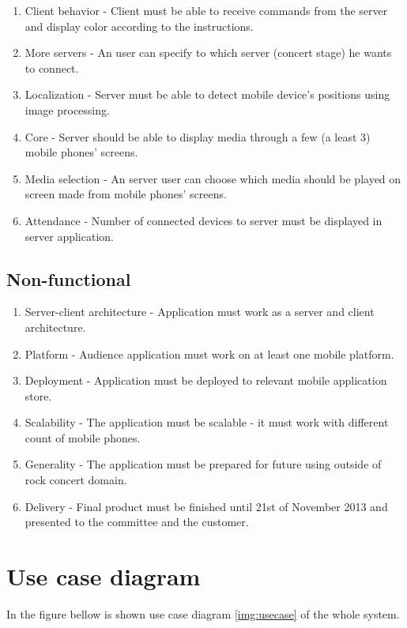     \begin{enumerate}
        \item Client behavior - Client must be able to receive commands from the server and display color according to the instructions.
        \item More servers - An user can specify to which server (concert stage) he wants to connect.
        \item Localization - Server must be able to detect mobile device's positions using image processing.
        \item Core - Server should be able to display media through a few (a least 3) mobile phones' screens.
        \item Media selection - An server user can choose which media should be played on screen made from mobile phones' screens.
        \item Attendance - Number of connected devices to server must be displayed in server application.
    \end{enumerate}

\subsection{Non-functional}

    \begin{enumerate}
        \item Server-client architecture - Application must work as a server and client architecture.
        \item Platform - Audience application must work on at least one mobile platform.
        \item Deployment - Application must be deployed to relevant mobile application store.
        \item Scalability - The application must be scalable - it must work with different count of mobile phones.
        \item Generality - The application must be prepared for future using outside of rock concert domain.
        \item Delivery - Final product must be finished until 21st of November 2013 and presented to the committee and the customer.
    \end{enumerate}
\section{Use case diagram}
In the figure bellow is shown use case diagram \ref{img:usecase} of the whole system.

